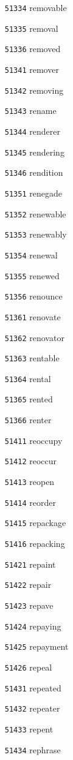 \documentclass[twoside,11pt]{article}
\begin{document}
\begin{multicols}{5}
\begin{enumerate}
\item[\texttt{51334}] removable
\item[\texttt{51335}] removal
\item[\texttt{51336}] removed
\item[\texttt{51341}] remover
\item[\texttt{51342}] removing
\item[\texttt{51343}] rename
\item[\texttt{51344}] renderer
\item[\texttt{51345}] rendering
\item[\texttt{51346}] rendition
\item[\texttt{51351}] renegade
\item[\texttt{51352}] renewable
\item[\texttt{51353}] renewably
\item[\texttt{51354}] renewal
\item[\texttt{51355}] renewed
\item[\texttt{51356}] renounce
\item[\texttt{51361}] renovate
\item[\texttt{51362}] renovator
\item[\texttt{51363}] rentable
\item[\texttt{51364}] rental
\item[\texttt{51365}] rented
\item[\texttt{51366}] renter
\item[\texttt{51411}] reoccupy
\item[\texttt{51412}] reoccur
\item[\texttt{51413}] reopen
\item[\texttt{51414}] reorder
\item[\texttt{51415}] repackage
\item[\texttt{51416}] repacking
\item[\texttt{51421}] repaint
\item[\texttt{51422}] repair
\item[\texttt{51423}] repave
\item[\texttt{51424}] repaying
\item[\texttt{51425}] repayment
\item[\texttt{51426}] repeal
\item[\texttt{51431}] repeated
\item[\texttt{51432}] repeater
\item[\texttt{51433}] repent
\item[\texttt{51434}] rephrase

\end{enumerate}
\end{multicols}
\end{document}
